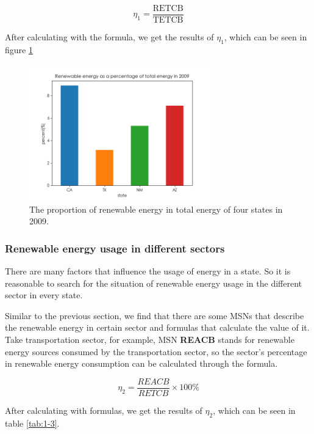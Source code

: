 \documentclass[a4paper,11pt]{article}
\begin{document}
\begin{equation}
    \eta_1=\frac{\text{RETCB}}{\text{TETCB}}
\end{equation}

\par After calculating with the formula, we get the results of $\eta_1$, which can be seen in figure \ref{fig:1-2}

\begin{figure}[H]%
    \centering 
    \includegraphics[width=0.7\textwidth]{./Pic/1-2.png}
    \caption{The proportion of renewable energy in total energy of four states in 2009.}
    \label{fig:1-2}  
\end{figure}
\subsubsection{Renewable energy usage in different sectors}
\par There are many factors that influence the usage of energy in a state. So it is reasonable to search for the situation of renewable energy usage in the different sector in every state.
\par Similar to the previous section, we find that there are some MSNs that describe the renewable energy in certain sector and formulas that calculate the value of it. 
Take transportation sector, for example, MSN \textbf{REACB} stands for renewable energy sources consumed by the transportation sector, so the sector's percentage in renewable energy consumption can be calculated through the formula. 

\begin{equation}
    \eta_2=\frac{REACB}{RETCB} \times 100\%
\end{equation}

\par After calculating with formulas, we get the results of $\eta_2 $, which can be seen in table \ref{tab:1-3}.
\end{document}
